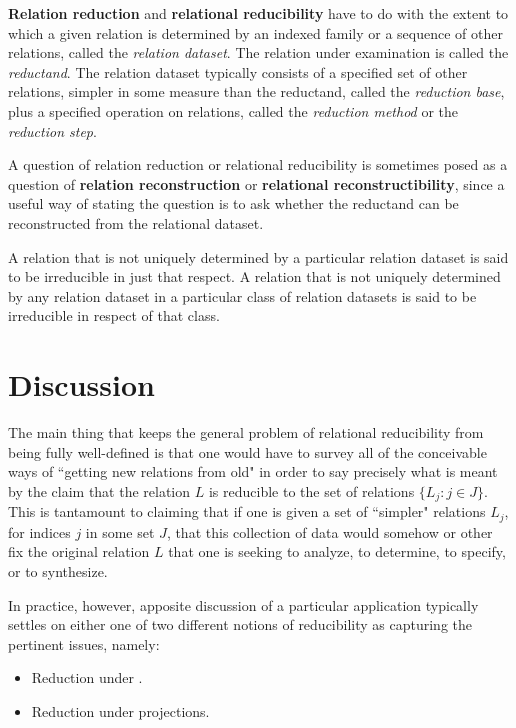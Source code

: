 \documentclass[12pt]{article}
\begin{document}
\textbf{Relation reduction} and \textbf{relational reducibility} have to do with the extent to which a given relation is determined by an indexed family or a sequence of other relations, called the \textit{relation dataset}.  The relation under examination is called the \textit{reductand}.  The relation dataset typically consists of a specified set of other relations, simpler in some measure than the reductand, called the \textit{reduction base}, plus a specified operation on relations, called the \textit{reduction method} or the \textit{reduction step}.

A question of relation reduction or relational reducibility is sometimes posed as a question of \textbf{relation reconstruction} or \textbf{relational reconstructibility}, since a useful way of stating the question is to ask whether the reductand can be reconstructed from the relational dataset.

A relation that is not uniquely determined by a particular relation dataset is said to be irreducible in just that respect.  A relation that is not uniquely determined by any relation dataset in a particular class of relation datasets is said to be irreducible in respect of that class.

\tableofcontents

\section{Discussion}

The main thing that keeps the general problem of relational reducibility from being fully well-defined is that one would have to survey all of the conceivable ways of ``getting new relations from old" in order to say precisely what is meant by the claim that the relation $L$ is reducible to the set of relations $\{ L_j : j \in J \}$.  This is tantamount to claiming that if one is given a set of ``simpler" relations $L_j$, for indices $j$ in some set $J$, that this collection of data would somehow or other fix the original relation $L$ that one is seeking to analyze, to determine, to specify, or to synthesize.

In practice, however, apposite discussion of a particular application typically settles on either one of two different notions of reducibility as capturing the pertinent issues, namely:

\begin{itemize}
\item
Reduction under .
\item
Reduction under projections.
\end{itemize}
\end{document}
